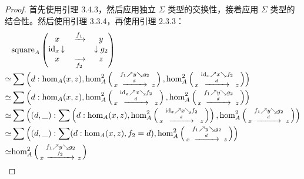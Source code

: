 \documentclass{ctexrep}
\theoremstyle{plain}
\theoremstyle{definition}
\theoremstyle{remark}
\theoremstyle{definition}
\theoremstyle{definition}
\theoremstyle{definition}
\begin{document}
\begin{proof}
首先使用引理 3.4.3，然后应用独立 $\Sigma$ 类型的交换性，接着应用 $\Sigma$ 类型的结合性。然后使用引理 3.3.4，再使用引理 2.3.3：
\begin{align*}
& \text{square}_A \left( 
\begin{matrix} 
x & \xrightarrow{f_1} & y \\ 
\text{id}_x \left\downarrow \rule{0pt}{1.5ex} \right. & & \left\downarrow \rule{0pt}{1.5ex} \right. g_2 \\ 
x & \xrightarrow[f_2]{} & z 
\end{matrix} 
\right) \\
\simeq & \sum \left( d : \text{hom}_A(x, z), \text{hom}_A^2 \left( \begin{smallmatrix} & f_1 \nearrow y \searrow g_2 & \\ x & \xrightarrow{\quad d \quad} & z \end{smallmatrix} \right), \text{hom}_A^2 \left( \begin{smallmatrix} & \text{id}_x \nearrow x \searrow f_2 & \\ x & \xrightarrow{\quad d \quad} & z \end{smallmatrix} \right) \right) \\
\simeq & \sum \left( d : \text{hom}_A(x, z), \text{hom}_A^2 \left( \begin{smallmatrix} & \text{id}_x \nearrow x \searrow f_2 & \\ x & \xrightarrow{\quad d \quad} & z \end{smallmatrix} \right), \text{hom}_A^2 \left( \begin{smallmatrix} & f_1 \nearrow y \searrow g_2 & \\ x & \xrightarrow{\quad d \quad} & z \end{smallmatrix} \right) \right) \\
\simeq & \sum \left( (d, \_) : \sum \left( d : \text{hom}_A(x, z), \text{hom}_A^2 \left( \begin{smallmatrix} & \text{id}_x \nearrow x \searrow f_2 & \\ x & \xrightarrow{\quad d \quad} & z \end{smallmatrix} \right) \right), \text{hom}_A^2 \left( \begin{smallmatrix} & f_1 \nearrow y \searrow g_2 & \\ x & \xrightarrow{\quad d \quad} & z \end{smallmatrix} \right) \right) \\
\simeq & \sum \left( (d, \_) : \sum ( d : \text{hom}_A(x, z), f_2 = d), \text{hom}_A^2 \left( \begin{smallmatrix} & f_1 \nearrow y \searrow g_2 & \\ x & \xrightarrow{\quad d \quad} & z \end{smallmatrix} \right) \right) \\
\simeq & \text{hom}_A^2 \left( \begin{smallmatrix} & f_1 \nearrow y \searrow g_2 & \\ x & \xrightarrow{\quad f_2 \quad} & z \end{smallmatrix} \right)
\end{align*}
\end{proof}
\end{document}

